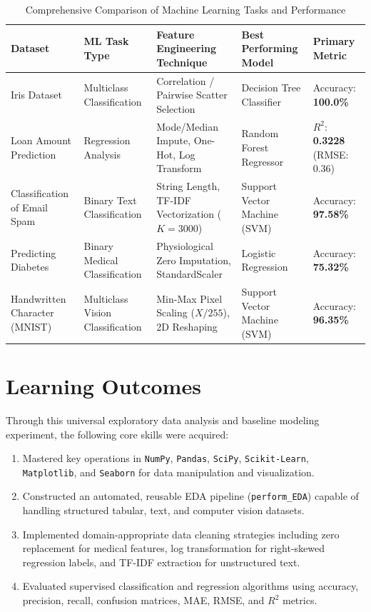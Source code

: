 \documentclass[12pt,a4paper]{article}
\begin{document}
\begin{table}[H]
\centering
\caption{Comprehensive Comparison of Machine Learning Tasks and Performance}
\label{tab:master_comparison}
\vspace{0.2cm}
\begin{tabular}{|p{3.5cm}|p{3cm}|p{3.5cm}|p{3.2cm}|p{2.2cm}|}
\hline
\textbf{Dataset} & \textbf{ML Task Type} & \textbf{Feature Engineering Technique} & \textbf{Best Performing Model} & \textbf{Primary Metric} \\ \hline
Iris Dataset & Multiclass Classification & Correlation / Pairwise Scatter Selection & Decision Tree Classifier & Accuracy: \textbf{100.0\%} \\ \hline
Loan Amount Prediction & Regression Analysis & Mode/Median Impute, One-Hot, Log Transform & Random Forest Regressor & $R^2$: \textbf{0.3228} (RMSE: 0.36) \\ \hline
Classification of Email Spam & Binary Text Classification & String Length, TF-IDF Vectorization ($K=3000$) & Support Vector Machine (SVM) & Accuracy: \textbf{97.58\%} \\ \hline
Predicting Diabetes & Binary Medical Classification & Physiological Zero Imputation, StandardScaler & Logistic Regression & Accuracy: \textbf{75.32\%} \\ \hline
Handwritten Character (MNIST) & Multiclass Vision Classification & Min-Max Pixel Scaling ($X/255$), 2D Reshaping & Support Vector Machine (SVM) & Accuracy: \textbf{96.35\%} \\ \hline
\end{tabular}
\end{table}

\section{Learning Outcomes}
Through this universal exploratory data analysis and baseline modeling experiment, the following core skills were acquired:
\begin{enumerate}
    \item Mastered key operations in \texttt{NumPy}, \texttt{Pandas}, \texttt{SciPy}, \texttt{Scikit-Learn}, \texttt{Matplotlib}, and \texttt{Seaborn} for data manipulation and visualization.
    \item Constructed an automated, reusable EDA pipeline (\texttt{perform\_EDA}) capable of handling structured tabular, text, and computer vision datasets.
    \item Implemented domain-appropriate data cleaning strategies including zero replacement for medical features, log transformation for right-skewed regression labels, and TF-IDF extraction for unstructured text.
    \item Evaluated supervised classification and regression algorithms using accuracy, precision, recall, confusion matrices, MAE, RMSE, and $R^2$ metrics.
\end{enumerate}
\end{document}
